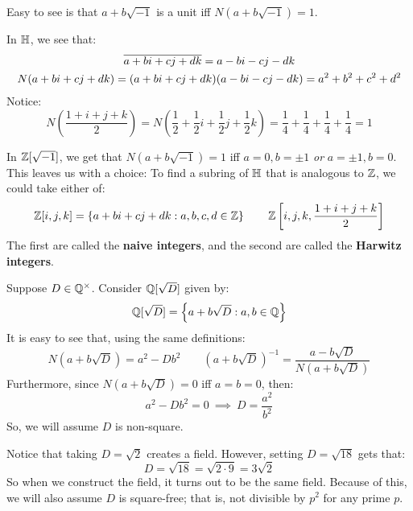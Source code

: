 Easy to see is that $ a+b\sqrt{-1} $ is a unit iff $ N(a+b\sqrt{-1}) = 1 $.

In $ \mathbb{H} $, we see that:
\begin{gather*}
    \overline{a+bi+cj+dk} = a-bi-cj-dk \\
    N(a+bi+cj+dk) = (a+bi+cj+dk)(a-bi-cj-dk) = a^{2}+b^{2}+c^{2}+d^{2}
\end{gather*}
Notice:
\begin{equation*}
    N\left( \frac{1+i+j+k}{2} \right) = N\left( \frac{1}{2} + \frac{1}{2}i +
    \frac{1}{2}j + \frac{1}{2}k \right) = \frac{1}{4} + \frac{1}{4} + \frac{1}{4} + \frac{1}{4} = 1
\end{equation*}

\newpage
In $ \mathbb{Z}[\sqrt{-1}] $, we get that $ N(a+b\sqrt{-1}) = 1 $ iff $ a = 0, b = \pm 1 $ \textit{or}
$ a = \pm 1, b = 0 $.
This leaves us with a choice:
To find a subring of $ \mathbb{H} $ that is analogous to $ \mathbb{Z} $, we could take either of:
\begin{equation*}
    \mathbb{Z}[i,j,k] = \left\{{a+bi+cj+dk:a,b,c,d \in \mathbb{Z}}\right\} \qquad
    \mathbb{Z}\left[i,j,k,\frac{1+i+j+k}{2}\right]
\end{equation*}
The first are called the \textbf{naive integers},
and the second are called the \textbf{Harwitz integers}.

Suppose $ D \in \mathbb{Q}^{\times} $. Consider $ \mathbb{Q}[\sqrt{D}] $ given by:
\begin{equation*}
    \mathbb{Q}[\sqrt{D}] = \left\{{a + b\sqrt{D} : a,b \in \mathbb{Q}}\right\}
\end{equation*}
It is easy to see that, using the same definitions:
\begin{equation*}
    N(a+b\sqrt{D}) = a^{2}-Db^{2} \qquad
    (a+b\sqrt{D})^{-1} = \frac{a-b\sqrt{D}}{N(a+b\sqrt{D})}
\end{equation*}
Furthermore, since $ N(a+b\sqrt{D}) = 0 $ iff $ a = b = 0 $, then:
\begin{equation*}
    a^{2} - Db^{2} = 0 \ \implies \ D = \frac{a^{2}}{b^{2}}
\end{equation*}
So, we will assume $ D $ is non-square.

Notice that taking $ D = \sqrt{2} $ creates a field. However, setting $ D = \sqrt{18} $ gets that:
\begin{equation*}
    D = \sqrt{18} = \sqrt{2\cdot 9} = 3\sqrt{2}
\end{equation*}
So when we construct the field, it turns out to be the same field.
Because of this, we will also assume $ D $ is square-free; that is, not divisible by $ p^{2} $ for
any prime $ p $.

